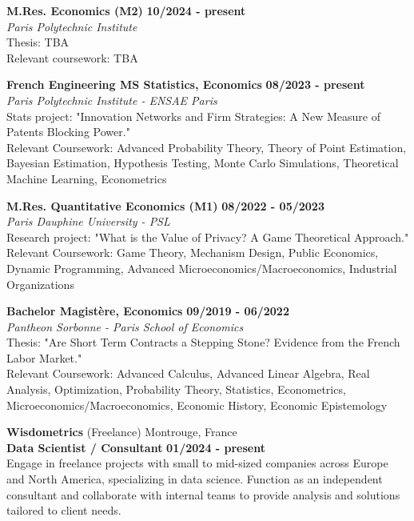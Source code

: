 \begin{flushleft}
\raisebox{-.6ex}{HIGHER EDUCATION} \hrulefill
\end{flushleft}

    \noindent\textbf{M.Res. \textbar\space Economics (M2)}
    \hfill
    \textbf{10/2024 - present} \\
    \emph{Paris Polytechnic Institute} \\
	Thesis: TBA \\
	Relevant coursework: TBA

    \noindent\textbf{French Engineering MS \textbar\space Statistics,  Economics}
    \hfill
    \textbf{08/2023 - present} \\
    \emph{Paris Polytechnic Institute - ENSAE Paris}\\
	Stats project: "Innovation Networks and Firm Strategies: A New Measure of Patents Blocking Power."\\
	Relevant Coursework: Advanced Probability Theory, Theory of Point Estimation, Bayesian Estimation, Hypothesis Testing, Monte Carlo Simulations, Theoretical Machine Learning, Econometrics

    \noindent\textbf{M.Res. \textbar\space Quantitative Economics (M1)}
    \hfill
    \textbf{08/2022 - 05/2023} \\
    \emph{Paris Dauphine University - PSL}\\
	Research project: "What is the Value of Privacy? A Game Theoretical Approach."\\
	Relevant Coursework: Game Theory, Mechanism Design, Public Economics, Dynamic Programming, Advanced Microeconomics/Macroeconomics, Industrial Organizations

    \noindent\textbf{Bachelor \textbar\space Magistère, Economics}
    \hfill
    \textbf{09/2019 - 06/2022} \\
    \emph{Pantheon Sorbonne - Paris School of Economics}\\
	Thesis: "Are Short Term Contracts a Stepping Stone? Evidence from the French Labor Market."\\
	Relevant Coursework: Advanced Calculus, Advanced Linear Algebra, Real Analysis, Optimization, Probability Theory, Statistics, Econometrics, Microeconomics/Macroeconomics, Economic History, Economic Epistemology
\begin{flushleft}
\raisebox{-.6ex}{WORK \& RESEARCH EXPERIENCE} \hrulefill
\end{flushleft}
	\noindent\textbf{Wisdometrics} (Freelance) \hfill Montrouge, France\\[0.1cm]
    \textbf{Data Scientist / Consultant} \hfill \textbf{01/2024  - present} \\
	Engage in freelance projects with small to mid-sized companies across Europe and North America, specializing in data science. Function as an independent consultant and collaborate with internal teams to provide analysis and solutions tailored to client needs.
    
